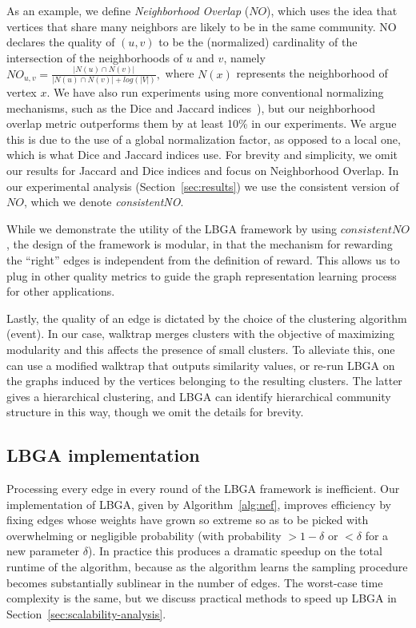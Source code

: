 \documentclass{IEEEtran}
\begin{document}
As an example, we define \emph{Neighborhood Overlap} ($NO$), which uses the
idea that vertices that share many neighbors are likely to be in the same
community. NO declares the quality of $(u,v)$ to be the (normalized)
cardinality of the intersection of the neighborhoods of $u$ and $v$, namely
$NO_{u,v}=\frac{|N(u) \cap N(v)|}{|N(u) \cap N(v)| + log(|V|)},$ where $N(x)$
represents the neighborhood of vertex $x$. We have also run experiments using
more conventional normalizing mechanisms, such as the Dice and Jaccard
indices~\cite{Dice1945,Jaccard1912}), but our neighborhood overlap metric
outperforms them by at least 10\% in our experiments. We argue this is due to
the use of a global normalization factor, as opposed to a local one, which is
what Dice and Jaccard indices use. For brevity and simplicity, we omit our
results for Jaccard and Dice indices and focus on Neighborhood Overlap. In our
experimental analysis (Section~\ref{sec:results}) we use the consistent version
of $NO$, which we denote \emph{consistentNO}. 

While we demonstrate the utility of the LBGA framework by using $consistentNO$,
the design of the framework is modular, in that the mechanism for rewarding the
``right'' edges is independent from the definition of reward. This allows us
to plug in other quality metrics to guide the graph representation learning
process for other applications.

Lastly, the quality of an edge is dictated by the choice of the clustering
algorithm (event). In our case, walktrap merges clusters with the objective of
maximizing modularity and this affects the presence of small clusters. To
alleviate this, one can use a modified walktrap that outputs similarity values,
or re-run LBGA on the graphs induced by the vertices belonging to the resulting
clusters. The latter gives a hierarchical clustering, and LBGA can identify
hierarchical community structure in this way, though we omit the details for
brevity. 

\subsection{LBGA implementation} 
Processing every edge in every round of the LBGA framework is inefficient.  Our
implementation of LBGA, given by Algorithm~\ref{alg:nef}, improves efficiency
by fixing edges whose weights have grown so extreme so as to be picked with
overwhelming or negligible probability (with probability $ > 1-\delta$ or $<
\delta$ for a new parameter $\delta$). In practice this produces a dramatic
speedup on the total runtime of the algorithm, because as the algorithm learns
the sampling procedure becomes substantially sublinear in the number of
edges. The worst-case time complexity is the same, but we discuss practical
methods to speed up LBGA in Section~\ref{sec:scalability-analysis}. 
\end{document}
